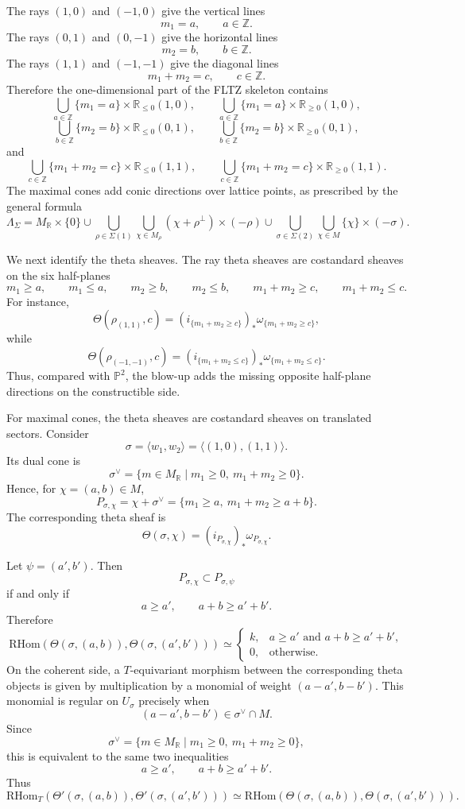 The rays \((1,0)\) and \((-1,0)\) give the vertical lines
\[
m_1=a,\qquad a\in\mathbb Z.
\]
The rays \((0,1)\) and \((0,-1)\) give the horizontal lines
\[
m_2=b,\qquad b\in\mathbb Z.
\]
The rays \((1,1)\) and \((-1,-1)\) give the diagonal lines
\[
m_1+m_2=c,\qquad c\in\mathbb Z.
\]
Therefore the one-dimensional part of the FLTZ skeleton contains
\[
\bigcup_{a\in\mathbb Z}\{m_1=a\}\times \mathbb R_{\le 0}(1,0),
\qquad
\bigcup_{a\in\mathbb Z}\{m_1=a\}\times \mathbb R_{\ge 0}(1,0),
\]
\[
\bigcup_{b\in\mathbb Z}\{m_2=b\}\times \mathbb R_{\le 0}(0,1),
\qquad
\bigcup_{b\in\mathbb Z}\{m_2=b\}\times \mathbb R_{\ge 0}(0,1),
\]
and
\[
\bigcup_{c\in\mathbb Z}\{m_1+m_2=c\}\times \mathbb R_{\le 0}(1,1),
\qquad
\bigcup_{c\in\mathbb Z}\{m_1+m_2=c\}\times \mathbb R_{\ge 0}(1,1).
\]
The maximal cones add conic directions over lattice points, as prescribed by
the general formula
\[
\Lambda_\Sigma
=
M_{\mathbb R}\times\{0\}
\cup
\bigcup_{\rho\in\Sigma(1)}
\bigcup_{\chi\in M_\rho}
(\chi+\rho^\perp)\times(-\rho)
\cup
\bigcup_{\sigma\in\Sigma(2)}
\bigcup_{\chi\in M}
\{\chi\}\times(-\sigma).
\]

We next identify the theta sheaves. The ray theta sheaves are costandard
sheaves on the six half-planes
\[
m_1\ge a,\qquad m_1\le a,\qquad
m_2\ge b,\qquad m_2\le b,\qquad
m_1+m_2\ge c,\qquad m_1+m_2\le c.
\]
For instance,
\[
\Theta(\rho_{(1,1)},c)
=
(i_{\{m_1+m_2\ge c\}})_*
\omega_{\{m_1+m_2\ge c\}},
\]
while
\[
\Theta(\rho_{(-1,-1)},c)
=
(i_{\{m_1+m_2\le c\}})_*
\omega_{\{m_1+m_2\le c\}}.
\]
Thus, compared with \(\mathbb P^2\), the blow-up adds the missing opposite
half-plane directions on the constructible side.

For maximal cones, the theta sheaves are costandard sheaves on translated
sectors. Consider
\[
\sigma=\langle w_1,w_2\rangle=\langle(1,0),(1,1)\rangle.
\]
Its dual cone is
\[
\sigma^\vee
=
\{m\in M_{\mathbb R}\mid m_1\ge 0,\ m_1+m_2\ge 0\}.
\]
Hence, for \(\chi=(a,b)\in M\),
\[
P_{\sigma,\chi}
=
\chi+\sigma^\vee
=
\{m_1\ge a,\ m_1+m_2\ge a+b\}.
\]
The corresponding theta sheaf is
\[
\Theta(\sigma,\chi)
=
(i_{P_{\sigma,\chi}})_*\omega_{P_{\sigma,\chi}}.
\]

Let \(\psi=(a',b')\). Then
\[
P_{\sigma,\chi}\subset P_{\sigma,\psi}
\]
if and only if
\[
a\ge a',
\qquad
a+b\ge a'+b'.
\]
Therefore
\[
\mathrm{RHom}(\Theta(\sigma,(a,b)),\Theta(\sigma,(a',b')))
\simeq
\begin{cases}
k, & a\ge a'\text{ and }a+b\ge a'+b',\\
0, & \text{otherwise}.
\end{cases}
\]
On the coherent side, a \(T\)-equivariant morphism between the corresponding
theta objects is given by multiplication by a monomial of weight
\((a-a',b-b')\). This monomial is regular on \(U_\sigma\) precisely when
\[
(a-a',b-b')\in\sigma^\vee\cap M.
\]
Since
\[
\sigma^\vee
=
\{m\in M_{\mathbb R}\mid m_1\ge 0,\ m_1+m_2\ge 0\},
\]
this is equivalent to the same two inequalities
\[
a\ge a',
\qquad
a+b\ge a'+b'.
\]
Thus
\[
\mathrm{RHom}_T(\Theta'(\sigma,(a,b)),\Theta'(\sigma,(a',b')))
\simeq
\mathrm{RHom}(\Theta(\sigma,(a,b)),\Theta(\sigma,(a',b'))).
\]

